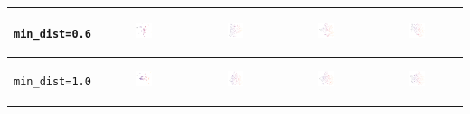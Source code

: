 \begin{tabular}{c|c|c|c|c}
	\hline
	\begin{sideways} \verb|min_dist=0.6| \end{sideways} & \includegraphics*[width = 0.2\textwidth]{min=0,6,n=2.png} & \includegraphics*[width = 0.2\textwidth]{min=0,6,n=3.png} & \includegraphics*[width = 0.2\textwidth]{min=0,6,n=4.png}
	& \includegraphics*[width = 0.2\textwidth]{min=0,6,n=5.png}\\
	\hline
	\begin{sideways} \verb|min_dist=1.0| \end{sideways} & \includegraphics*[width = 0.2\textwidth]{min=1,0,n=2.png} & \includegraphics*[width = 0.2\textwidth]{min=1,0,n=3.png} & \includegraphics*[width = 0.2\textwidth]{min=1,0,n=4.png} & \includegraphics*[width = 0.2\textwidth]{min=1,0,n=5.png}\\

\end{tabular}
